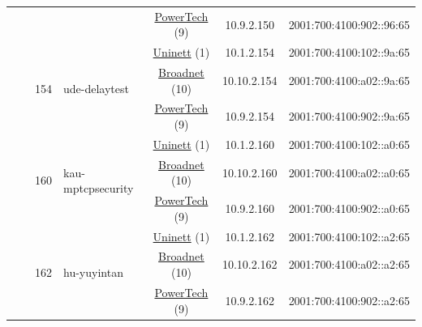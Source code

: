 \begin{small}
\begin{center}
\begin{longtable}{|c|c|c|c|c|c|c|c|}
  &  &  &  & \multicolumn{2}{|c|}{\tiny{\href{http://www.powertech.no}{PowerTech} (9)}} & \tiny{10.9.2.150} & \tiny{2001:700:4100:902::96:65} \\* \cline{3-3}\cline{4-4}\cline{5-5}\cline{6-6}\cline{7-7}\cline{8-8}
  &  & \multirow{3}{*}{\tiny{154}} & \multicolumn{1}{|l|}{\multirow{3}{*}{\tiny{ude-delaytest}}} & \multicolumn{2}{|c|}{\tiny{\href{https://www.uninett.no}{Uninett} (1)}} & \tiny{10.1.2.154} & \tiny{2001:700:4100:102::9a:65} \\* \cline{5-5}\cline{6-6}\cline{7-7}\cline{8-8}
  &  &  &  & \multicolumn{2}{|c|}{\tiny{\href{https://www.broadnet.no}{Broadnet} (10)}} & \tiny{10.10.2.154} & \tiny{2001:700:4100:a02::9a:65} \\* \cline{5-5}\cline{6-6}\cline{7-7}\cline{8-8}
  &  &  &  & \multicolumn{2}{|c|}{\tiny{\href{http://www.powertech.no}{PowerTech} (9)}} & \tiny{10.9.2.154} & \tiny{2001:700:4100:902::9a:65} \\* \cline{3-3}\cline{4-4}\cline{5-5}\cline{6-6}\cline{7-7}\cline{8-8}
  &  & \multirow{3}{*}{\tiny{160}} & \multicolumn{1}{|l|}{\multirow{3}{*}{\tiny{kau-mptcpsecurity}}} & \multicolumn{2}{|c|}{\tiny{\href{https://www.uninett.no}{Uninett} (1)}} & \tiny{10.1.2.160} & \tiny{2001:700:4100:102::a0:65} \\* \cline{5-5}\cline{6-6}\cline{7-7}\cline{8-8}
  &  &  &  & \multicolumn{2}{|c|}{\tiny{\href{https://www.broadnet.no}{Broadnet} (10)}} & \tiny{10.10.2.160} & \tiny{2001:700:4100:a02::a0:65} \\* \cline{5-5}\cline{6-6}\cline{7-7}\cline{8-8}
  &  &  &  & \multicolumn{2}{|c|}{\tiny{\href{http://www.powertech.no}{PowerTech} (9)}} & \tiny{10.9.2.160} & \tiny{2001:700:4100:902::a0:65} \\* \cline{3-3}\cline{4-4}\cline{5-5}\cline{6-6}\cline{7-7}\cline{8-8}
  &  & \multirow{3}{*}{\tiny{162}} & \multicolumn{1}{|l|}{\multirow{3}{*}{\tiny{hu-yuyintan}}} & \multicolumn{2}{|c|}{\tiny{\href{https://www.uninett.no}{Uninett} (1)}} & \tiny{10.1.2.162} & \tiny{2001:700:4100:102::a2:65} \\* \cline{5-5}\cline{6-6}\cline{7-7}\cline{8-8}
  &  &  &  & \multicolumn{2}{|c|}{\tiny{\href{https://www.broadnet.no}{Broadnet} (10)}} & \tiny{10.10.2.162} & \tiny{2001:700:4100:a02::a2:65} \\* \cline{5-5}\cline{6-6}\cline{7-7}\cline{8-8}
  &  &  &  & \multicolumn{2}{|c|}{\tiny{\href{http://www.powertech.no}{PowerTech} (9)}} & \tiny{10.9.2.162} & \tiny{2001:700:4100:902::a2:65} \\* \cline{3-3}\cline{4-4}\cline{5-5}\cline{6-6}\cline{7-7}\cline{8-8}

\end{longtable}
\end{center}
\end{small}
